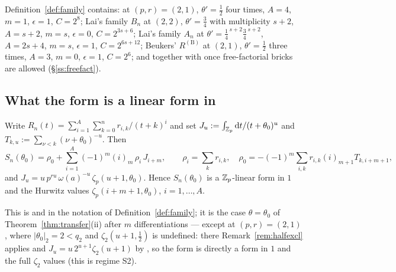 \begin{finding}\label{find:contains}
 Definition~\ref{def:family} contains:
\cite[Def.~10]{LSZ2025} at $(p,r)=(2,1)$, $\theta'=\tfrac12$ four times, $A=4$, $m=1$,
$\epsilon=1$, $C=2^8$; Lai's family $B_n$ \cite[(3.2)]{Lai2025} at $(2,2)$,
$\theta'=\tfrac34$ with multiplicity $s+2$, $A=s+2$, $m=s$, $\epsilon=0$, $C=2^{3s+6}$;
Lai's family $A_n$ \cite[(3.1)]{Lai2025} at $\theta'=\tfrac14^{\,s+2}\tfrac34^{\,s+2}$,
$A=2s+4$, $m=s$, $\epsilon=1$, $C=2^{6s+12}$; Beukers' $R^{(\mathrm B)}$
\cite{Beukers2008} at $(2,1)$, $\theta'=\tfrac12$ three times, $A=3$, $m=0$, $\epsilon=1$,
$C=2^6$; and \cite[Def.~16]{LaiSprang2023} together with
\cite[Def.~3.1]{LLS2025} once free-factorial bricks are allowed
(\S\ref{ss:freefact}).
\end{finding}

\subsection{What the form is a linear form in}\label{ss:linearform}

\begin{proposition}\label{prop:linform}
\PROVED{} Write $R_n(t)=\sum_{i=1}^{A}\sum_{k=0}^{n}r_{i,k}/(t+k)^i$ and set
$J_u:=\int_{\mathbb{Z}_p}\mathrm{d} t/(t+\theta_0)^u$ and $T_{k,u}:=\sum_{\nu<k}(\nu+\theta_0)^{-u}$. Then
\begin{equation}\label{eq:Sn}
 S_n(\theta_0)=\rho_0+\sum_{i=1}^{A}(-1)^m(i)_m\,\rho_i\,J_{i+m},
 \qquad
 \rho_i=\sum_kr_{i,k},\quad
 \rho_0=-(-1)^m\sum_{i,k}r_{i,k}(i)_{m+1}T_{k,i+m+1},
\end{equation}
and $J_u=u\,p^{ru}\,\omega(a)^{-u}\,\zeta_p(u+1,\theta_0)$. Hence $S_n(\theta_0)$ is a
$\mathbb{Z}_p$-linear form in $1$ and the Hurwitz values $\zeta_p(i+m+1,\theta_0)$, $i=1,\dots,A$.
\end{proposition}

This is \cite[Lemma 5]{LSZ2025} and \cite[Lemma 21]{LaiSprang2023} in the notation of
Definition~\ref{def:family}; it is the case $\theta=\theta_0$ of
Theorem~\ref{thm:transfer}(ii) after $m$ differentiations --- except at $(p,r)=(2,1)$,
where $|\theta_0|_2=2<q_2$ and $\zeta_2(u+1,\tfrac12)$ is undefined: there
Remark~\ref{rem:halfexcl} applies and $J_u=u\,2^{u+1}\zeta_2(u+1)$ by
\cite[Lemma 9]{LSZ2025}, so the form is directly a form in $1$ and the full $\zeta_2$
values (this is regime S2).


